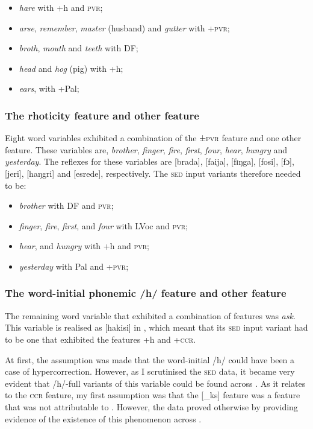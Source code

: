{{{\begin{itemize}
\item {\emph{hare} with +h and \textminus\textsc{pvr};}
\item {\emph{arse}, \emph{remember}, \emph{master} (husband) and \emph{gutter} with +\textsc{pvr}; }
\item{\emph{broth}, \emph{mouth} and \emph{teeth} with \textminus{}DF; }
\item {\emph{head} and \emph{hog} (pig) with +h;}
\item{\emph{ears}, with +Pal; }
\end{itemize}

\subsubsection{The rhoticity feature and other feature} \label{3.3.2.7}
Eight word variables exhibited a combination of the ±\textsc{pvr} feature and one other feature. These variables are, \emph{brother}, \emph{finger}, \emph{fire}, \emph{first}, \emph{four}, \emph{hear}, \emph{hungry} and \emph{yesterday}. The  reflexes for these variables are [brada], [faija], [fɪŋga], [fosi], [fɔ], [jeri], [haŋgri] and [esrede], respectively. The \textsc{sed} input variants therefore needed to be:

\begin{itemize}
\item {\emph{brother} with \textminus{}DF and \textminus\textsc{pvr};}
\item {\emph{finger}, \emph{fire}, \emph{first}, and \emph{four} with \textminus{}LVoc and \textminus\textsc{pvr}; }
\item{\emph{hear}, and \emph{hungry} with +h and \textminus\textsc{pvr}; }
\item {\emph{yesterday} with \textminus Pal and +\textsc{pvr};}
\end{itemize}

\subsubsection{The word-initial phonemic /h/ feature and other feature} \label{3.3.2.8}
The remaining word variable that exhibited a combination of features was \emph{ask}. This variable is realised as [hakisi] in , which meant that its \textsc{sed} input variant had to be one that exhibited the features +h and +\textsc{ccr}.

At first, the assumption was made that the word-initial /h/ could have been a case of hypercorrection. However, as I scrutinised the \textsc{sed} data, it became very evident that /h/-full variants of this variable could be found across . As it relates to the \textsc{ccr} feature, my first assumption was that the [\_ks] feature was a  feature that was not attributable to . However, the data proved otherwise by providing evidence of the existence of this phenomenon across .

}}}
